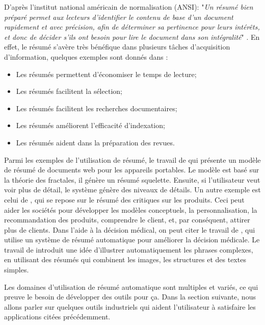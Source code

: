 \documentclass[a4paper,12pt,oneside]{../use/ESIthesis}
\begin{document}
D'après l'institut national américain de normalisation (ANSI): "\textit{Un résumé bien préparé permet aux lecteurs d'identifier le contenu de base d'un document rapidement et avec précision, afin de déterminer sa pertinence pour leurs intérêts, et donc de décider s'ils ont besoin pour lire le document dans son intégralité}" \cite{07-hassel}. 
En effet, le résumé s'avère très bénéfique dans plusieurs tâches d'acquisition d'information, quelques exemples sont donnés dans \cite{75-borko-bernier}:
\begin{itemize}
\item Les résumés permettent d'économiser le temps de lecture;
\item Les résumés facilitent la sélection;
\item Les résumés facilitent les recherches documentaires;
\item Les résumés améliorent l'efficacité d'indexation;
\item Les résumés aident dans la préparation des revues.
\end{itemize}

Parmi les exemples de l'utilisation de résumé, le travail de \cite{07-yang-wang} qui présente un modèle de résumé de documents web pour les appareils portables. 
Le modèle est basé sur la théorie des fractales, il génère un résumé squelette. 
Ensuite, si l'utilisateur veut voir plus de détail, le système génère des niveaux de détails. 
Un autre exemple est celui de \cite{09-zhan-al}, qui se repose sur le résumé des critiques sur les produits. 
Ceci peut aider les sociétés pour développer les modèles conceptuels, la personnalisation, la recommandation des produits, comprendre le client, et, par conséquent, attirer plus de clients.
Dans l'aide à la décision médical, on peut citer le travail de \cite{12-workman-al}, qui utilise un système de résumé automatique pour améliorer la décision médicale. 
Le travail de \cite{11-uzzaman-al} introduit une idée d'illustrer automatiquement les phrases complexes, en utilisant des résumés qui combinent les images, les structures et des textes simples. 

Les domaines d'utilisation de résumé automatique sont multiples et variés, ce qui preuve le besoin de développer des outils pour ça. 
Dans la section suivante, nous allons parler sur quelques outils industriels qui aident l'utilisateur à satisfaire les applications citées précédemment.

\end{document}
